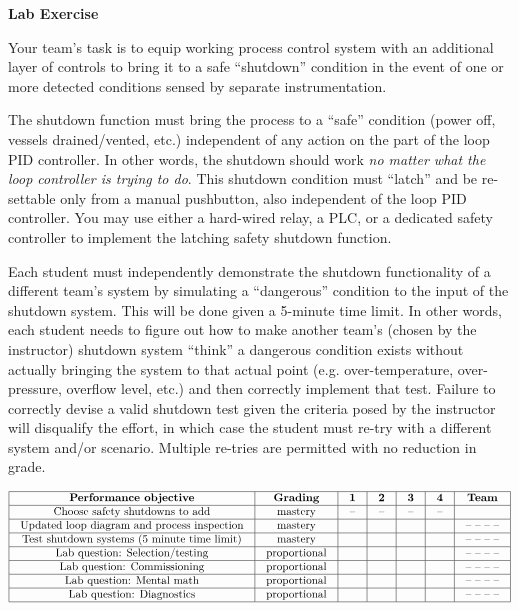 \documentclass[12pt,a4paper]{article}
\begin{document}
\noindent
{\bf Lab Exercise}

\vskip 5pt

Your team's task is to equip working process control system with an additional layer of controls to bring it to a safe ``shutdown'' condition in the event of one or more detected conditions sensed by separate instrumentation.

The shutdown function must bring the process to a ``safe'' condition (power off, vessels drained/vented, etc.) independent of any action on the part of the loop PID controller.  In other words, the shutdown should work {\it no matter what the loop controller is trying to do}.  This shutdown condition must ``latch'' and be re-settable only from a manual pushbutton, also independent of the loop PID controller.  You may use either a hard-wired relay, a PLC, or a dedicated safety controller to implement the latching safety shutdown function.

Each student must independently demonstrate the shutdown functionality of a different team's system by simulating a ``dangerous'' condition to the input of the shutdown system.  This will be done given a 5-minute time limit.  In other words, each student needs to figure out how to make another team's (chosen by the instructor) shutdown system ``think'' a dangerous condition exists without actually bringing the system to that actual point (e.g. over-temperature, over-pressure, overflow level, etc.) and then correctly implement that test.  Failure to correctly devise a valid shutdown test given the criteria posed by the instructor will disqualify the effort, in which case the student must re-try with a different system and/or scenario.  Multiple re-tries are permitted with no reduction in grade.

\vskip 10pt



$$\vbox{\offinterlineskip
\halign{\strut
\vrule \quad\hfil # \ \hfil & 
\vrule \quad\hfil # \ \hfil & 
\vrule \quad\hfil # \ \hfil & 
\vrule \quad\hfil # \ \hfil & 
\vrule \quad\hfil # \ \hfil & 
\vrule \quad\hfil # \ \hfil & 
\vrule \quad\hfil # \ \hfil \vrule \cr
\noalign{\hrule}
%
{\bf Performance objective} & {\bf Grading} & {\bf 1} & {\bf 2} & {\bf 3} & {\bf 4} & {\bf Team} \cr
%
\noalign{\hrule}
%
Choose safety shutdowns to add & mastery & -- & -- & -- & -- & \cr
%
\noalign{\hrule}
%
Updated loop diagram and process inspection & mastery & & & & & -- -- -- -- \cr
%
\noalign{\hrule}
%
Test shutdown systems (5 minute time limit) & mastery & & & & & -- -- -- -- \cr
%
\noalign{\hrule}
%
Lab question: Selection/testing & proportional &  &  &  &  & -- -- -- -- \cr
%
\noalign{\hrule}
%
Lab question: Commissioning & proportional &  &  &  &  & -- -- -- -- \cr
%
\noalign{\hrule}
%
Lab question: Mental math & proportional &  &  &  &  & -- -- -- -- \cr
%
\noalign{\hrule}
%
Lab question: Diagnostics & proportional &  &  &  &  & -- -- -- -- \cr
%
\noalign{\hrule}
} %
}$$ %
\end{document}
